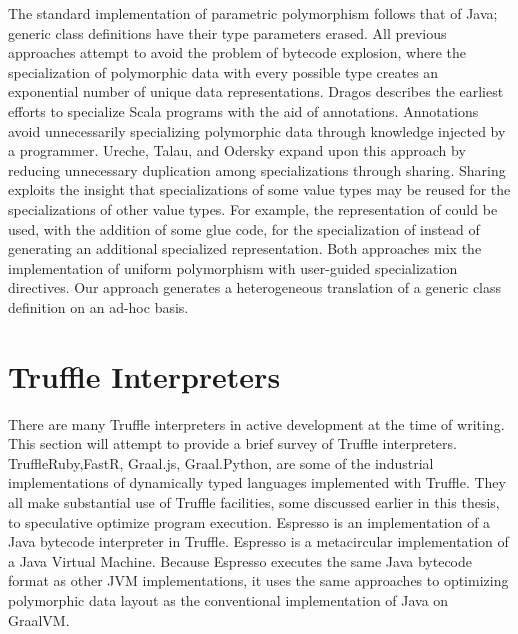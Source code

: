 The standard implementation of parametric polymorphism follows that of Java; generic class definitions have their type parameters erased.
All previous approaches attempt to avoid the problem of bytecode explosion, where the specialization of polymorphic data with every possible type creates an exponential number of unique data representations.
Dragos describes the earliest efforts to specialize Scala programs with the aid of annotations\cite{scala:specialization}.
Annotations avoid unnecessarily specializing polymorphic data through knowledge injected by a programmer.
Ureche, Talau, and Odersky expand upon this approach by reducing unnecessary duplication among specializations through sharing\cite{scala:miniboxing}.
Sharing exploits the insight that specializations of some value types may be reused for the specializations of other value types.
For example, the representation of  could be used, with the addition of some glue code, for the specialization of  instead of generating an additional specialized representation. 
Both approaches mix the implementation of uniform polymorphism with user-guided specialization directives.
Our approach generates a heterogeneous translation of a generic class definition on an ad-hoc basis.

\section{Truffle Interpreters}

There are many Truffle interpreters in active development at the time of writing.
This section will attempt to provide a brief survey of Truffle interpreters.
TruffleRuby\cite{trufflyruby:specialization,truffleruby:object-model},FastR, Graal.js, Graal.Python,\cite{truffle:thesis} are some of the industrial implementations of dynamically typed languages implemented with Truffle.
They all make substantial use of Truffle facilities, some discussed earlier in this thesis, to speculative optimize program execution. 
Espresso\cite{graalvm:espresso} is an implementation of a Java bytecode interpreter in Truffle. 
Espresso is a metacircular implementation of a Java Virtual Machine.
Because Espresso executes the same Java bytecode format as other JVM implementations, it uses the same approaches to optimizing polymorphic data layout as the conventional implementation of Java on GraalVM.


